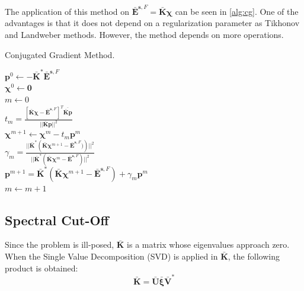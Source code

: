 			The application of this method on $\mathbf{\bar{E}}^{\mathbf{s},F}=\mathbf{\bar{K}}\boldsymbol{\chi}$ can be seen in \autoref{alg:cg}. One of the advantages is that it does not depend on a regularization parameter as Tikhonov and Landweber methods. However, the method depends on more operations.
			\begin{algorithm}[!htb]
				\caption{Conjugated Gradient Method.}
				\label{alg:cg}
				$\mathbf{p}^0 \leftarrow -\mathbf{\bar{K}^*}\mathbf{\bar{E}}^{\mathbf{s},F}$ \\
				$\boldsymbol{\chi}^0 \leftarrow \mathbf{0}$ \\
				$m\leftarrow 0$ \\
				 {
					$t_m = \frac{\left[\mathbf{\bar{K}}\boldsymbol{\chi}-\mathbf{\bar{E}}^{\mathbf{s},F}\right]^T\overline{\mathbf{\bar{K}}\mathbf{p}}}{||\mathbf{\bar{K}}\mathbf{p}||^2} $ \\
					$\boldsymbol{\chi}^{m+1} \leftarrow \boldsymbol{\chi}^m - t_m\mathbf{p}^m$ \\
					$\gamma_m = \frac{||\mathbf{\bar{K}^*}\left(\mathbf{\bar{K}}\boldsymbol{\chi}^{m+1}-\mathbf{\bar{E}}^{\mathbf{s},F})\right)||^2}{||\mathbf{\bar{K}^*}\left(\mathbf{\bar{K}}\boldsymbol{\chi}^m-\mathbf{\bar{E}}^{\mathbf{s},F}\right)||^2}$ \\
					$\mathbf{p}^{m+1} = \mathbf{\bar{K}^*}\left(\mathbf{\bar{K}}\boldsymbol{\chi}^{m+1}-\mathbf{\bar{E}}^{\mathbf{s},F}\right) + \gamma_m \mathbf{p}^m$ \\
					$m \leftarrow m + 1$ \\
				}
			\end{algorithm}
				
		\subsection{Spectral Cut-Off}\label{chap:methods:linear:spectral}
					
			Since the problem is ill-posed, $\mathbf{\bar{K}}$ is a matrix whose eigenvalues approach zero. When the Single Value Decomposition (SVD) is applied in $\mathbf{\bar{K}}$, the following product is obtained:
			\begin{equation}
				\mathbf{\bar{K}} = \mathbf{\bar{U}}\boldsymbol{\bar{\xi}}\mathbf{\bar{V}}^* \label{eq:3:linear:spectral:0}
			\end{equation}
		
